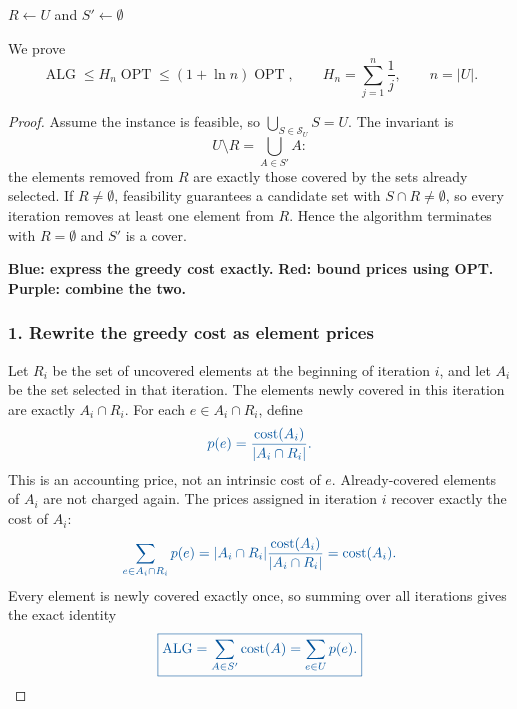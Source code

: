 \documentclass[10pt]{article}
\theoremstyle{definition}
\newcommand{\OPT}{\operatorname{OPT}}
\newcommand{\ALG}{\operatorname{ALG}}
\begin{document}
\begin{algorithm}[H]
$R\gets U$ and $S'\gets\emptyset$\;
\;
\end{algorithm}

We prove
\[
  \ALG\leq H_n\OPT\leq(1+\ln n)\OPT,
  \qquad
  H_n=\sum_{j=1}^{n}\frac1j,\qquad n=|U|.
\]

\begin{proof}
Assume the instance is feasible, so
$\bigcup_{S\in\mathcal{S}_U}S=U$. The invariant is
\[
  U\setminus R=\bigcup_{A\in S'}A:
\]
the elements removed from $R$ are exactly those covered by the sets already
selected. If $R\neq\emptyset$, feasibility guarantees a candidate set with
$S\cap R\neq\emptyset$, so every iteration removes at least one element from
$R$. Hence the algorithm terminates with $R=\emptyset$ and $S'$ is a cover.

\medskip
\noindent
\textcolor{algblue}{\textbf{Blue: express the greedy cost exactly.}}\quad
\textcolor{optred}{\textbf{Red: bound prices using OPT.}}\quad
\textcolor{bridgepurple}{\textbf{Purple: combine the two.}}

\subsubsection*{\textcolor{algblue}{1. Rewrite the greedy cost as element prices}}

Let $R_i$ be the set of uncovered elements at the beginning of iteration $i$,
and let $A_i$ be the set selected in that iteration. The elements newly
covered in this iteration are exactly $A_i\cap R_i$. For each
$e\in A_i\cap R_i$, define
\[
  \color{algblue}
  p(e)=\frac{\operatorname{cost}(A_i)}{|A_i\cap R_i|}.
\]
This is an accounting price, not an intrinsic cost of $e$. Already-covered
elements of $A_i$ are not charged again. The prices assigned in iteration
$i$ recover exactly the cost of $A_i$:
\[
  \color{algblue}
  \sum_{e\in A_i\cap R_i}p(e)
  =|A_i\cap R_i|\frac{\operatorname{cost}(A_i)}{|A_i\cap R_i|}
  =\operatorname{cost}(A_i).
\]
Every element is newly covered exactly once, so summing over all iterations
gives the exact identity
\[
  \color{algblue}
  \boxed{\ALG=\sum_{A\in S'}\operatorname{cost}(A)
  =\sum_{e\in U}p(e).}
\]


\end{proof}
\end{document}
